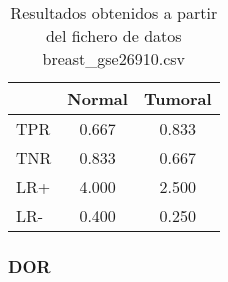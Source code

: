 \bigbreak

\begin{table}[ht]
    \centering
    \begin{tabular}[t]{lcc}
            & \hspace{20pt}Normal\hspace{20pt} & Tumoral \\\hline
        TPR & 0.667                            & 0.833   \\\hline
        TNR & 0.833                            & 0.667   \\\hline
        LR+ & 4.000                            & 2.500   \\\hline
        LR- & 0.400                            & 0.250   \\\hline
    \end{tabular}
    \caption{Resultados obtenidos a partir del fichero de datos breast\_gse26910.csv}
    \label{tab:3}
\end{table}


\subsubsection{DOR}

